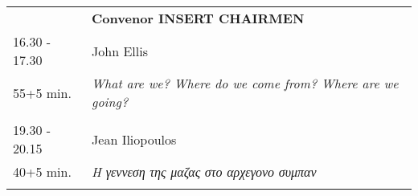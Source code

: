 \begin{longtable}{p{3cm}p{13cm}}
&\hfill {\bf Convenor INSERT CHAIRMEN }\\ 
16.30 - 17.30 & John Ellis\\ 
55+5 min. & {\it What are we? Where do we come from? Where are we going?}\\ 
 & \\ 
19.30 - 20.15 & Jean Iliopoulos\\ 
40+5 min. & {\it Η γεννεση της μαζας στο αρχεγονο συμπαν}\\ 
 & \\ 
\end{longtable}

